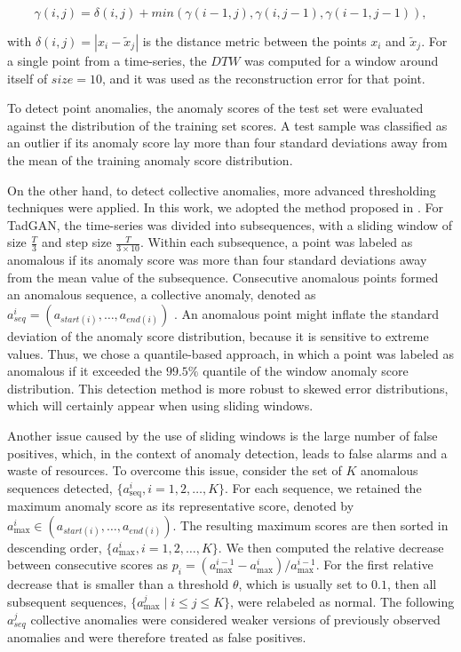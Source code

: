 $$\gamma(i, j) = \delta(i,j) + min(\gamma(i-1,j), \gamma(i, j-1), \gamma(i-1, j-1)),$$

with $\delta(i,j) = |x_i - \tilde{x}_j|$ is the distance metric between the points $x_i$ and $\tilde{x}_j$. For a single point from a time-series, the $DTW$ was computed for a window around itself of $size = 10$, and it was used as the reconstruction error for that point. 

To detect point anomalies, the anomaly scores of the test set were evaluated against the distribution of the training set scores. A test sample was classified as an outlier if its anomaly score lay more than four standard deviations away from the mean of the training anomaly score distribution.

On the other hand, to detect collective anomalies, more advanced thresholding techniques were applied. In this work, we adopted the method proposed in \cite{geiger2020tadgan}. For TadGAN, the time-series was divided into subsequences, with a sliding window of size $\frac{T}{3}$ and step size $\frac{T}{3 \times 10}$. Within each subsequence, a point was labeled as anomalous if its anomaly score was more than four standard deviations away from the mean value of the subsequence. Consecutive anomalous points formed an anomalous sequence, a collective anomaly, denoted as $a_{seq}^i = (a_{start(i)}, \dots, a_{end(i)})$ \cite{geiger2020tadgan}. An anomalous point might inflate the standard deviation of the anomaly score distribution, because it is sensitive to extreme values. Thus, we chose a quantile-based approach, in which a point was labeled as anomalous if it exceeded the $99.5\%$ quantile of the window anomaly score distribution. This detection method is more robust to skewed error distributions, which will certainly appear when using sliding windows.

Another issue caused by the use of sliding windows is the large number of false positives, which, in the context of anomaly detection, leads to false alarms and a waste of resources. To overcome this issue, consider the set of $K$ anomalous sequences detected, $\{a_{\text{seq}}^i, i=1,2,\dots,K\}$. For each sequence, we retained the maximum anomaly score as its representative score, denoted by $a_{\max}^i \in (a_{start(i)},\dots, a_{end(i)})$. The resulting maximum scores are then sorted in descending order, $\{a_{\max}^i, i=1,2,\dots, K\}$. We then computed the relative decrease between consecutive scores as $p_i = \left(a_{\max}^{i-1} - a_{\max}^i\right) / a_{\max}^{i-1}$. For the first relative decrease that is smaller than a threshold $\theta$, which is usually set to $0.1$, then all subsequent sequences, $\{a_{\max}^j \mid i \leq j \leq K\}$, were relabeled as normal. The following $a_{seq}^j$ collective anomalies were considered weaker versions of previously observed anomalies and were therefore treated as false positives. 


